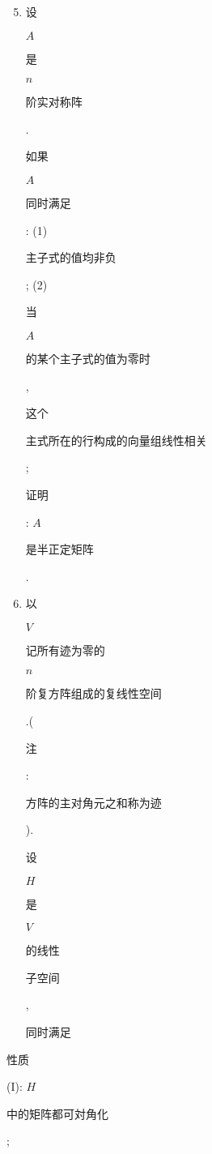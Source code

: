 \documentclass[10pt]{article}
\begin{document}
\begin{enumerate}
  \setcounter{enumi}{4}
  \item \begin{CJK}{UTF8}{mj}设\end{CJK} $A$ \begin{CJK}{UTF8}{mj}是\end{CJK} $n$ \begin{CJK}{UTF8}{mj}阶实对称阵\end{CJK}. \begin{CJK}{UTF8}{mj}如果\end{CJK} $A$ \begin{CJK}{UTF8}{mj}同时满足\end{CJK}: (1) \begin{CJK}{UTF8}{mj}主子式的值均非负\end{CJK}; (2) \begin{CJK}{UTF8}{mj}当\end{CJK} $A$ \begin{CJK}{UTF8}{mj}的某个主子式的值为零时\end{CJK}, \begin{CJK}{UTF8}{mj}这个\end{CJK} \begin{CJK}{UTF8}{mj}主式所在的行构成的向量组线性相关\end{CJK}; \begin{CJK}{UTF8}{mj}证明\end{CJK}: $A$ \begin{CJK}{UTF8}{mj}是半正定矩阵\end{CJK}.

  \item \begin{CJK}{UTF8}{mj}以\end{CJK} $V$ \begin{CJK}{UTF8}{mj}记所有迹为零的\end{CJK} $n$ \begin{CJK}{UTF8}{mj}阶复方阵组成的复线性空间\end{CJK}.(\begin{CJK}{UTF8}{mj}注\end{CJK}: \begin{CJK}{UTF8}{mj}方阵的主对角元之和称为迹\end{CJK}). \begin{CJK}{UTF8}{mj}设\end{CJK} $H$ \begin{CJK}{UTF8}{mj}是\end{CJK} $V$ \begin{CJK}{UTF8}{mj}的线性\end{CJK} \begin{CJK}{UTF8}{mj}子空间\end{CJK}, \begin{CJK}{UTF8}{mj}同时满足\end{CJK}

\end{enumerate}
\begin{CJK}{UTF8}{mj}性质\end{CJK} (I): $H$ \begin{CJK}{UTF8}{mj}中的矩阵都可対角化\end{CJK};
\end{document}
